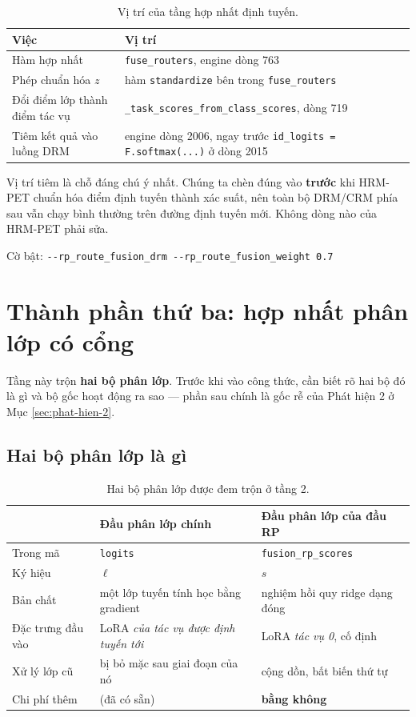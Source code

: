 \documentclass[11pt,a4paper]{article}
\begin{document}
\begin{table}[htbp]
\centering
\caption{Vị trí của tầng hợp nhất định tuyến.}
\begin{tabular}{lL}
\toprule
Việc & Vị trí \\
\midrule
Hàm hợp nhất & \texttt{fuse\_routers}, engine dòng 763 \\
Phép chuẩn hóa $z$ & hàm \texttt{standardize} bên trong \texttt{fuse\_routers} \\
Đổi điểm lớp thành điểm tác vụ
  & \texttt{\_task\_scores\_from\_class\_scores}, dòng 719 \\
Tiêm kết quả vào luồng DRM
  & engine dòng 2006, ngay trước \texttt{id\_logits = F.softmax(...)} ở dòng 2015 \\
\bottomrule
\end{tabular}
\end{table}

Vị trí tiêm là chỗ đáng chú ý nhất. Chúng ta chèn đúng vào \textbf{trước} khi
HRM-PET chuẩn hóa điểm định tuyến thành xác suất, nên toàn bộ DRM/CRM phía sau
vẫn chạy bình thường trên đường định tuyến mới. Không dòng nào của HRM-PET phải
sửa.

\noindent Cờ bật:
\texttt{-{}-rp\_route\_fusion\_drm -{}-rp\_route\_fusion\_weight 0.7}

\section{Thành phần thứ ba: hợp nhất phân lớp có cổng}
\label{sec:tang2}

Tầng này trộn \textbf{hai bộ phân lớp}. Trước khi vào công thức, cần biết rõ hai
bộ đó là gì và bộ gốc hoạt động ra sao --- phần sau chính là gốc rễ của Phát hiện
2 ở Mục \ref{sec:phat-hien-2}.

\subsection{Hai bộ phân lớp là gì}
\label{sec:hai-bo-phanlop}

\begin{table}[htbp]
\centering
\caption{Hai bộ phân lớp được đem trộn ở tầng 2.}
\label{tab:hai-bo}
\begin{tabular}{@{}p{3.0cm}p{5.2cm}p{5.2cm}@{}}
\toprule
 & Đầu phân lớp chính & Đầu phân lớp của đầu RP \\
\midrule
Trong mã & \texttt{logits} & \texttt{fusion\_rp\_scores} \\
Ký hiệu & $\ell$ & $s$ \\
Bản chất & một lớp tuyến tính học bằng gradient
         & nghiệm hồi quy ridge dạng đóng \\
Đặc trưng đầu vào & LoRA \emph{của tác vụ được định tuyến tới}
         & LoRA \emph{tác vụ 0}, cố định \\
Xử lý lớp cũ & bị bỏ mặc sau giai đoạn của nó
         & cộng dồn, bất biến thứ tự \\
Chi phí thêm & (đã có sẵn) & \textbf{bằng không} \\
\bottomrule
\end{tabular}
\end{table}
\end{document}
